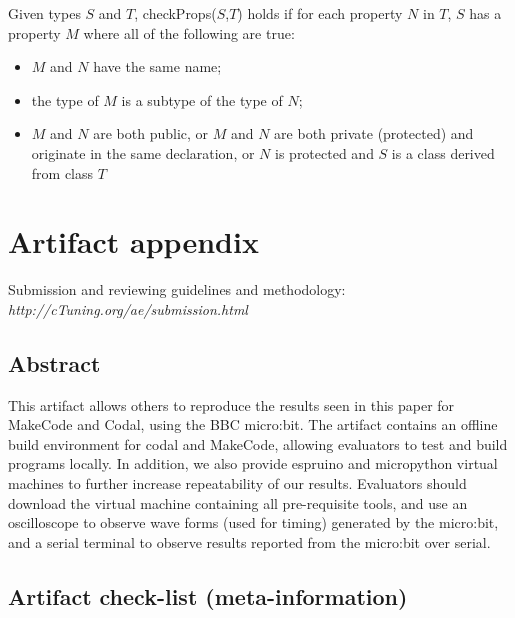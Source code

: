 Given types $S$ and $T$, checkProps($S$,$T$) holds if for each property $N$ in $T$,
$S$ has a property $M$ where all of the following are true:
\begin{itemize}
\item $M$ and $N$ have the same name;
\item the type of $M$ is a subtype of the type of $N$;
\item $M$ and $N$ are both public, or $M$ and $N$ are both
      private (protected) and originate in the same declaration,
      or $N$ is protected and $S$ is a class derived from class $T$
\end{itemize}

\section{Artifact appendix}

Submission and reviewing guidelines and methodology: \\
{\em http://cTuning.org/ae/submission.html}

\subsection{Abstract}

This artifact allows others to reproduce the results seen in this paper for MakeCode and Codal, using the BBC micro:bit. The artifact contains an offline build environment for codal and MakeCode, allowing evaluators to test and build programs locally. In addition, we also provide espruino and micropython virtual machines to further increase repeatability of our results. Evaluators should download the virtual machine containing all pre-requisite tools, and use an oscilloscope to observe wave forms (used for timing) generated by the micro:bit, and a serial terminal to observe results reported from the micro:bit over serial.


\subsection{Artifact check-list (meta-information)}

